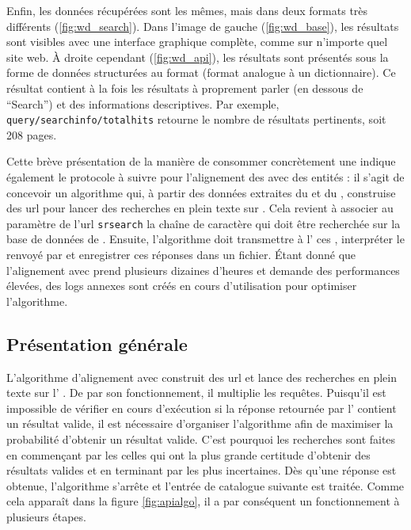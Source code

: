 Enfin, les données récupérées sont les mêmes, mais dans deux formats très différents (\ref{fig:wd_search}). Dans l'image de gauche (\ref{fig:wd_base}), les résultats sont visibles avec une interface graphique complète, comme sur n'importe quel site web. À droite cependant (\ref{fig:wd_api}), les résultats sont présentés sous la forme de données structurées au format \json{} (format analogue à un \gls{dictionnaire}). Ce résultat contient à la fois les résultats à proprement parler (en dessous de \enquote{Search}) et des informations descriptives. Par exemple, \texttt{query/searchinfo/totalhits} retourne le nombre de résultats pertinents, soit 208 pages.

Cette brève présentation de la manière de consommer concrètement une \api{} indique également le protocole à suivre pour l'alignement des \tname{} avec des entités \wkd{}: il s'agit de concevoir un algorithme qui, à partir des données extraites du \tname{} et du \ttrait{}, construise des \gls{url} pour lancer des recherches en plein texte sur \wkd{}. Cela revient à associer au paramètre de l'\gls{url} \texttt{srsearch} la chaîne de caractère qui doit être recherchée sur la base de données de \wkd{}. Ensuite, l'algorithme doit transmettre à l'\api{} ces \url{}, interpréter le \json{} renvoyé par \wkd{} et enregistrer ces réponses dans un fichier. Étant donné que l'alignement avec \wkd{} prend plusieurs dizaines d'heures et demande des performances élevées, des \glspl{log} annexes sont créés en cours d'utilisation pour optimiser l'algorithme.


\subsection{Présentation générale}
L'algorithme d'alignement avec \wkd{} construit des \gls{url} et lance des recherches en plein texte sur l'\api{} \wkd{}. De par son fonctionnement, il multiplie les requêtes. Puisqu'il est impossible de vérifier en cours d'exécution si la réponse retournée par l'\api{} contient un résultat valide, il est nécessaire d'organiser l'algorithme afin de maximiser la probabilité d'obtenir un résultat valide. C'est pourquoi les recherches sont faites en commençant par les celles qui ont la plus grande certitude d'obtenir des résultats valides et en terminant par les plus incertaines. Dès qu'une réponse est obtenue, l'algorithme s'arrête et l'entrée de catalogue suivante est traitée. Comme cela apparaît dans la figure \ref{fig:apialgo}, il a par conséquent un fonctionnement à plusieurs étapes.

